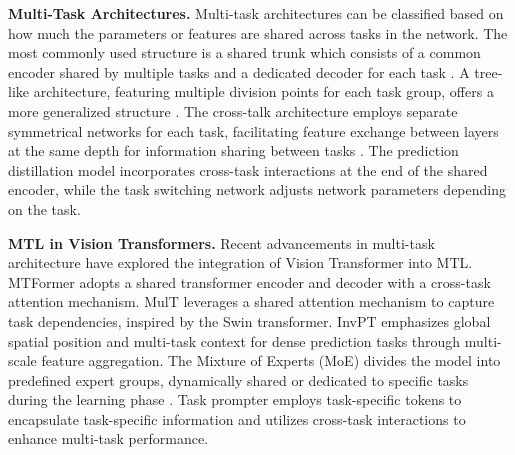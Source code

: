 \textbf{Multi-Task Architectures.} Multi-task architectures can be classified based on how much the parameters or features are shared across tasks in the network. The most commonly used structure is a shared trunk which consists of a common encoder shared by multiple tasks and a dedicated decoder for each task \cite{RN51, RN52, RN49, RN50}. A tree-like architecture, featuring multiple division points for each task group, offers a more generalized structure \cite{treelike1, treelike2, treelike3, treelike4}. The cross-talk architecture employs separate symmetrical networks for each task, facilitating feature exchange between layers at the same depth for information sharing between tasks \cite{RN43, RN29}. The prediction distillation model \cite{RN9, RN29, RN32, pap} incorporates cross-task interactions at the end of the shared encoder, while the task switching network \cite{RN30, RN40, RN42, RN2} adjusts network parameters depending on the task.

\noindent\textbf{MTL in Vision Transformers.} Recent advancements in multi-task architecture have explored the integration of Vision Transformer \cite{vit, swin, pvt, focal, segformer, crossformer} into MTL. MTFormer \cite{mtformer} adopts a shared transformer encoder and decoder with a cross-task attention mechanism. MulT \cite{mult} leverages a shared attention mechanism to capture task dependencies, inspired by the Swin transformer. InvPT \cite{invpt} emphasizes global spatial position and multi-task context for dense prediction tasks through multi-scale feature aggregation. The Mixture of Experts (MoE) divides the model into predefined expert groups, dynamically shared or dedicated to specific tasks during the learning phase \cite{riquelme2021scaling, zhang2022mixture, fan2022m3vit, mustafa2022multimodal, chen2023mod, ye2023taskexpert}. Task prompter \cite{xu2023multi, xu2023demt, ye2022taskprompter} employs task-specific tokens to encapsulate task-specific information and utilizes cross-task interactions to enhance multi-task performance. 

